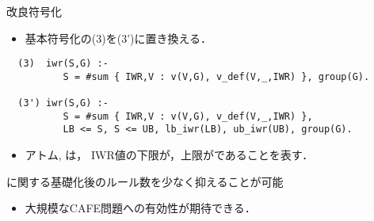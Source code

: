 \documentclass[dvipdfmx, 11pt]{beamer}
\begin{document}
\begin{frame}[fragile]{改良符号化}
 \begin{itemize}
  \item 基本符号化の(3)を(3')に置き換える．
 \end{itemize}
\begin{exampleblock}{}
 \footnotesize
 \begin{lstlisting}
  (3)  iwr(S,G) :- 
          S = #sum { IWR,V : v(V,G), v_def(V,_,IWR) }, group(G).

  (3') iwr(S,G) :- 
          S = #sum { IWR,V : v(V,G), v_def(V,_,IWR) },
          LB <= S, S <= UB, lb_iwr(LB), ub_iwr(UB), group(G).
 \end{lstlisting}
\end{exampleblock}
 \begin{itemize}
  \item アトム, \footnotemark[2]は，
	IWR値の下限が，上限がであることを表す．
 \end{itemize}
 \begin{block}{}
  に関する基礎化後のルール数を少なく抑えることが可能
  \begin{itemize}
   \item \alert{大規模なCAFE問題への有効性が期待できる．}
  \end{itemize}
 \end{block}
\end{frame}
\end{document}
